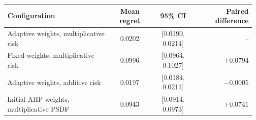 \begin{tabular}{lccr}
\toprule
Configuration & Mean regret & 95\% CI & Paired difference \\
\midrule
Adaptive weights, multiplicative risk & 0.0202 & [0.0190, 0.0214] & -- \\
Fixed weights, multiplicative risk & 0.0996 & [0.0964, 0.1027] & $+0.0794$ \\
Adaptive weights, additive risk & 0.0197 & [0.0184, 0.0211] & $-0.0005$ \\
Initial AHP weights, multiplicative PSDF & 0.0943 & [0.0914, 0.0973] & $+0.0741$ \\
\bottomrule
\end{tabular}
